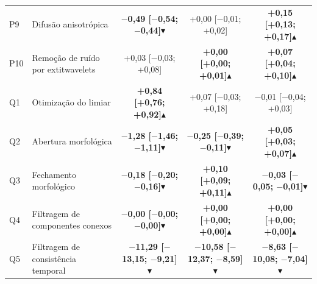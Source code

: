 \begin{table}[htbp]
\begin{sbcfitwidth}
\begin{tabular}{llccc}
P9 & Difusão anisotrópica & \textbf{$-$0{,}49 [$-$0{,}54; $-$0{,}44]}$\blacktriangledown$ & +0{,}00 [$-$0{,}01; +0{,}02] & \textbf{+0{,}15 [+0{,}13; +0{,}17]}$\blacktriangle$ \\
P10 & Remoção de ruído por 	extit{wavelets} & +0{,}03 [$-$0{,}03; +0{,}08] & \textbf{+0{,}00 [+0{,}00; +0{,}01]}$\blacktriangle$ & \textbf{+0{,}07 [+0{,}04; +0{,}10]}$\blacktriangle$ \\
\midrule
Q1 & Otimização do limiar & \textbf{+0{,}84 [+0{,}76; +0{,}92]}$\blacktriangle$ & +0{,}07 [$-$0{,}03; +0{,}18] & $-$0{,}01 [$-$0{,}04; +0{,}03] \\
Q2 & Abertura morfológica & \textbf{$-$1{,}28 [$-$1{,}46; $-$1{,}11]}$\blacktriangledown$ & \textbf{$-$0{,}25 [$-$0{,}39; $-$0{,}11]}$\blacktriangledown$ & \textbf{+0{,}05 [+0{,}03; +0{,}07]}$\blacktriangle$ \\
Q3 & Fechamento morfológico & \textbf{$-$0{,}18 [$-$0{,}20; $-$0{,}16]}$\blacktriangledown$ & \textbf{+0{,}10 [+0{,}09; +0{,}11]}$\blacktriangle$ & \textbf{$-$0{,}03 [$-$0{,}05; $-$0{,}01]}$\blacktriangledown$ \\
Q4 & Filtragem de componentes conexos & \textbf{$-$0{,}00 [$-$0{,}00; $-$0{,}00]}$\blacktriangledown$ & \textbf{+0{,}00 [+0{,}00; +0{,}00]}$\blacktriangle$ & \textbf{+0{,}00 [+0{,}00; +0{,}00]}$\blacktriangle$ \\
Q5 & Filtragem de consistência temporal & \textbf{$-$11{,}29 [$-$13{,}15; $-$9{,}21]}$\blacktriangledown$ & \textbf{$-$10{,}58 [$-$12{,}37; $-$8{,}59]}$\blacktriangledown$ & \textbf{$-$8{,}63 [$-$10{,}08; $-$7{,}04]}$\blacktriangledown$ \\
\bottomrule
\end{tabular}
\end{sbcfitwidth}
\end{table}
